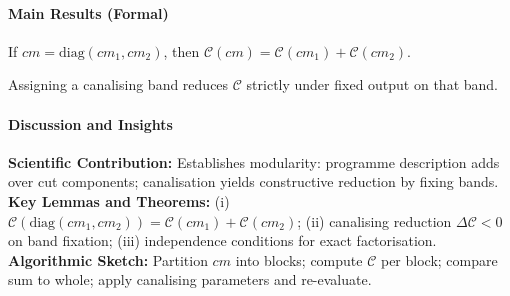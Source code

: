 \paragraph{Main Results (Formal)}
\begin{theorem}
If \(cm=\mathrm{diag}(cm_1,cm_2)\), then \(\mathcal{C}(cm)=\mathcal{C}(cm_1)+\mathcal{C}(cm_2)\).
\end{theorem}
\begin{lemma}
Assigning a canalising band reduces \(\mathcal{C}\) strictly under fixed output on that band.
\end{lemma}
\paragraph{Discussion and Insights}
\textbf{Scientific Contribution:} Establishes modularity: programme description adds over cut components; canalisation yields constructive reduction by fixing bands.
\textbf{Key Lemmas and Theorems:} (i) \(\mathcal{C}(\mathrm{diag}(cm_1,cm_2))=\mathcal{C}(cm_1)+\mathcal{C}(cm_2)\); (ii) canalising reduction \(\Delta \mathcal{C}<0\) on band fixation; (iii) independence conditions for exact factorisation.
\textbf{Algorithmic Sketch:} Partition \(cm\) into blocks; compute \(\mathcal{C}\) per block; compare sum to whole; apply canalising parameters and re-evaluate.

